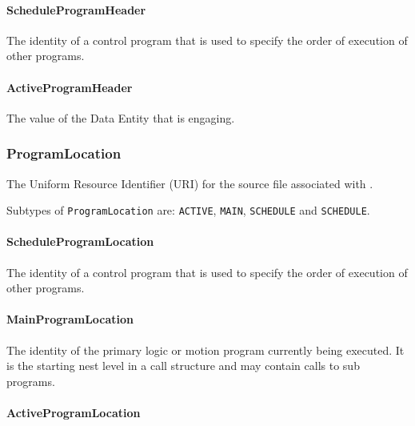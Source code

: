 \paragraph{ScheduleProgramHeader}\mbox{}
\label{sec:ScheduleProgramHeader}



The identity of a control program that is used to specify the order of execution of other programs.


\paragraph{ActiveProgramHeader}\mbox{}
\label{sec:ActiveProgramHeader}



The value of the \gls{Data Entity} that is engaging.


\subsubsection{ProgramLocation}
\label{sec:ProgramLocation}



The Uniform Resource Identifier (URI) for the source file associated with .


Subtypes of \texttt{ProgramLocation} are: \texttt{ACTIVE}, \texttt{MAIN}, \texttt{SCHEDULE} and \texttt{SCHEDULE}. 
\FloatBarrier

\paragraph{ScheduleProgramLocation}\mbox{}
\label{sec:ScheduleProgramLocation}



The identity of a control program that is used to specify the order of execution of other programs.


\paragraph{MainProgramLocation}\mbox{}
\label{sec:MainProgramLocation}



The identity of the primary logic or motion program currently being executed. It is the starting nest level in a call structure and may contain calls to sub programs.


\paragraph{ActiveProgramLocation}\mbox{}
\label{sec:ActiveProgramLocation}



